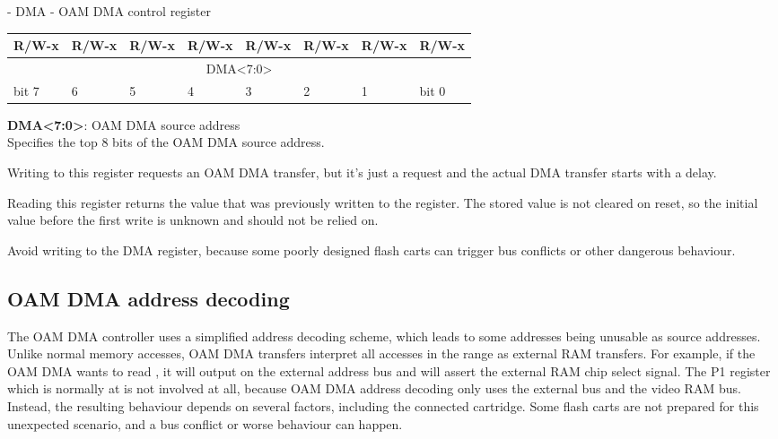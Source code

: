 \begin{register}[H]
  \caption{ - DMA - OAM DMA control register}
  {
    \ttfamily
    \begin{tabularx}{\textwidth}{|X|X|X|X|X|X|X|X|}
      \hline
      R/W-x                           & R/W-x & R/W-x & R/W-x & R/W-x & R/W-x & R/W-x & R/W-x \\
      \hline
      \multicolumn{8}{|c|}{DMA<7:0>} \\
      \hline
      bit 7                           & 6     & 5     & 4     & 3     & 2     & 1     & bit 0 \\
      \hline
    \end{tabularx}
  }

  \begin{description}[leftmargin=5em, style=nextline]
    \item[bit 0]
      \textbf{DMA<7:0>}: OAM DMA source address \\
      Specifies the top 8 bits of the OAM DMA source address.

      Writing to this register requests an OAM DMA transfer, but it's just a
      request and the actual DMA transfer starts with a delay.

      Reading this register returns the value that was previously written to
      the register. The stored value is not cleared on reset, so the initial
      value before the first write is unknown and should not be relied on.
  \end{description}
\end{register}

\begin{warning}
  Avoid writing  to the DMA register, because some poorly
designed flash carts can trigger bus conflicts or other dangerous behaviour.
\end{warning}

\subsection{OAM DMA address decoding}

The OAM DMA controller uses a simplified address decoding scheme, which leads
to some addresses being unusable as source addresses. Unlike normal memory
accesses, OAM DMA transfers interpret all accesses in the 
range as external RAM transfers. For example, if the OAM DMA wants to read
, it will output  on the external address bus and will
assert the external RAM chip select signal. The P1 register which is normally
at  is not involved at all, because OAM DMA address decoding only
uses the external bus and the video RAM bus. Instead, the resulting behaviour
depends on several factors, including the connected cartridge. Some flash carts
are not prepared for this unexpected scenario, and a bus conflict or worse
behaviour can happen.

